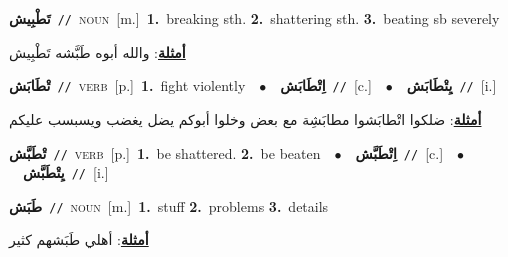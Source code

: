 \documentclass[10pt,a4paper,twoside]{article} %
\begin{document}
\begin{multicols}{2}
{\setlength\topsep{0pt}\textbf{\foreignlanguage{arabic}{تَطْبِيش}}\ {\color{gray}\texttt{//}\color{black}}\ \textsc{noun}\ [m.]\ \textbf{1.}~breaking sth.  \textbf{2.}~shattering sth.  \textbf{3.}~beating sb severely\  \begin{flushright}\color{gray}\foreignlanguage{arabic}{\textbf{\underline{\foreignlanguage{arabic}{أمثلة}}}: والله أبوه طَبَّشه تَطْبِيش}\end{flushright}\color{black}} \vspace{2mm}

{\setlength\topsep{0pt}\textbf{\foreignlanguage{arabic}{تْطَابَش}}\ {\color{gray}\texttt{//}\color{black}}\ \textsc{verb}\ [p.]\ \textbf{1.}~fight violently\ \ $\bullet$\ \ \setlength\topsep{0pt}\textbf{\foreignlanguage{arabic}{اِتْطَابَش}}\ {\color{gray}\texttt{//}\color{black}}\ [c.]\ \ $\bullet$\ \ \setlength\topsep{0pt}\textbf{\foreignlanguage{arabic}{يِتْطَابَش}}\ {\color{gray}\texttt{//}\color{black}}\ [i.]\  \begin{flushright}\color{gray}\foreignlanguage{arabic}{\textbf{\underline{\foreignlanguage{arabic}{أمثلة}}}: ضلكوا اتْطابَشوا مطابَشِة مع بعض وخلوا أبوكم يضل يغضب ويسبسب عليكم}\end{flushright}\color{black}} \vspace{2mm}

{\setlength\topsep{0pt}\textbf{\foreignlanguage{arabic}{تْطَبَّش}}\ {\color{gray}\texttt{//}\color{black}}\ \textsc{verb}\ [p.]\ \textbf{1.}~be shattered.  \textbf{2.}~be beaten\ \ $\bullet$\ \ \setlength\topsep{0pt}\textbf{\foreignlanguage{arabic}{اِتْطَبَّش}}\ {\color{gray}\texttt{//}\color{black}}\ [c.]\ \ $\bullet$\ \ \setlength\topsep{0pt}\textbf{\foreignlanguage{arabic}{يِتْطَبَّش}}\ {\color{gray}\texttt{//}\color{black}}\ [i.]\ } \vspace{2mm}

{\setlength\topsep{0pt}\textbf{\foreignlanguage{arabic}{طَبَش}}\ {\color{gray}\texttt{//}\color{black}}\ \textsc{noun}\ [m.]\ \textbf{1.}~stuff  \textbf{2.}~problems  \textbf{3.}~details\  \begin{flushright}\color{gray}\foreignlanguage{arabic}{\textbf{\underline{\foreignlanguage{arabic}{أمثلة}}}: أهلي طَبَشهم كثير}\end{flushright}\color{black}} \vspace{2mm}


\end{multicols}
\end{document}
